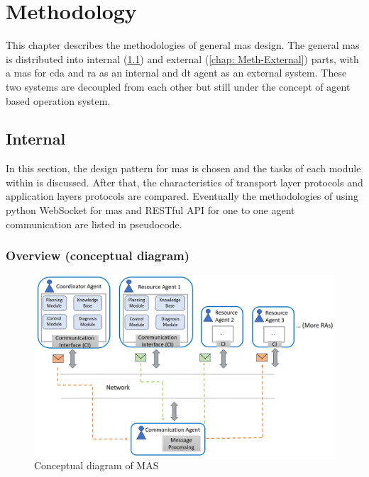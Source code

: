 \chapter{Methodology}\label{chap: Meth}%
This chapter describes the methodologies of general \gls{mas} design. 
The general \gls{mas} is distributed into internal (\ref{chap: Meth-Internal}) and external (\ref{chap: Meth-External}) parts,  
with a \gls{mas} for \gls{cda} and \gls{ra} as an internal and \gls{dt} agent as an external system. 
These two systems are decoupled from each other but still under the concept of agent based operation system. 
\section{Internal}\label{chap: Meth-Internal}
In this section, the design pattern for \gls{mas} is chosen and the tasks of each module within is discussed.
After that, the characteristics of transport layer protocols and application layers protocols are compared. 
Eventually the methodologies of using python WebSocket for \gls{mas} and RESTful API for one to one agent communication are listed in pseudocode. 

\subsection{Overview (conceptual diagram)}

\begin{figure}[htb]
\includegraphics[width=\textwidth]{figures/MAS_Conceptual_Diagram.png}
\centering
\caption{Conceptual diagram of MAS\label{fig: MASConceptual}}
\end{figure}


